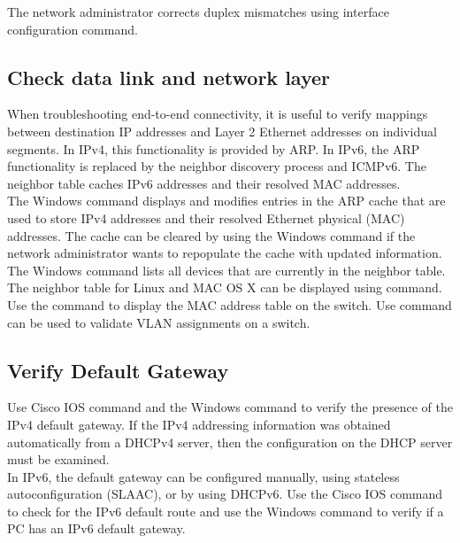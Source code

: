 The network administrator corrects duplex mismatches using  interface configuration command.

\subsection{Check data link and network layer}

When troubleshooting end-to-end connectivity, it is useful to verify mappings between destination IP addresses and Layer 2 Ethernet addresses on individual segments. In IPv4, this functionality is provided by ARP. In IPv6, the ARP functionality is replaced by the neighbor discovery process and ICMPv6. The neighbor table caches IPv6 addresses and their resolved MAC addresses.\\

The  Windows command displays and modifies entries in the ARP cache that are used to store IPv4 addresses and their resolved Ethernet physical (MAC) addresses. The cache can be cleared by using the  Windows command if the network administrator wants to repopulate the cache with updated information.\\

The  Windows command lists all devices that are currently in the neighbor table. The neighbor table for Linux and MAC OS X can be displayed using  command.\\

Use the  command to display the MAC address table on the switch.  Use  command can be used to validate VLAN assignments on a switch.

\subsection{Verify Default Gateway}

Use  Cisco IOS command and the  Windows command to verify the presence of the IPv4 default gateway. If the IPv4 addressing information was obtained automatically from a DHCPv4 server, then the configuration on the DHCP server must be examined. \\

In IPv6, the default gateway can be configured manually, using stateless autoconfiguration (SLAAC), or by using DHCPv6. Use the  Cisco IOS command to check for the IPv6 default route and use the  Windows command to verify if a PC has an IPv6 default gateway.

